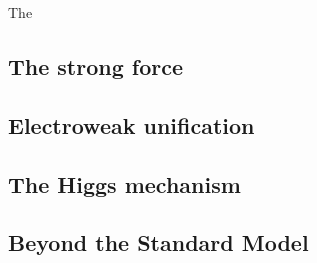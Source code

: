 The 

\subsection{The strong force}


\subsection{Electroweak unification}








\subsection{The Higgs mechanism}

\subsection{Beyond the Standard Model}





